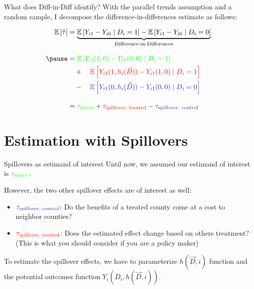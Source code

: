 \documentclass[aspectratio=169]{beamer}
\begin{document}
\begin{frame}{What does Diff-in-Diff identify?}
    With the parallel trends assumption and a random sample, I decompose the difference-in-differences estimate as follows: 
        
    \begin{align*}
        \mathbb{E}\left[\hat{\tau}\right] &= \underbrace{\mathbb{E} \left[ Y_{i1} - Y_{i0} \mid D_i = 1 \right] - \mathbb{E} \left[ Y_{i1} - Y_{i0} \mid D_i = 0 \right]}_{\text{Difference-in-Differences}} \\[3mm]
        \pause&= 
        \textcolor{green}{\mathbb{E} \left[ Y_{i1}(1, 0) - Y_{i1}(0, 0) \mid D_i = 1 \right]} \\
        &\quad + \quad 
        \textcolor{red}{\mathbb{E} \left[ Y_{i1}(1, h_i(\vec{D})) - Y_{i1}(1, 0) \mid D_i = 1 \right]} \\ 
        &\quad - \quad  
        \textcolor{purple}{\mathbb{E} \left[ Y_{i1}(0, h_i(\vec{D})) - Y_{i1}(0, 0) \mid D_i = 0 \right]} \\[3mm]
        &= \textcolor{green}{\tau_{\text{direct}}} + \textcolor{red}{\tau_{\text{spillover, treated}}} - \textcolor{purple}{\tau_{\text{spillover, control}}}
    \end{align*}

\end{frame}


\section{Estimation with Spillovers}

\begin{frame}{Spillovers as estimand of interest}
    Until now, we assumed our estimand of interest is $\textcolor{green}{\tau_{\text{direct}}}$.
    
    However, the two other spillover effects are of interest as well:
    \begin{itemize}
        \item $\textcolor{purple}{\tau_{\text{spillover, control}}}$: Do the benefits of a treated county come at a cost to neighbor counties? 
        
        \item $\textcolor{red}{\tau_{\text{spillover, treated}}}$: Does the estimated effect change based on others treatment? (This is what you should consider if you are a policy maker)
    \end{itemize}
    
    To estimate the spillover effects, we have to parameterize $h(\vec{D}, i)$ function and the potential outcomes function $Y_i(D_i, h(\vec{D}, i))$.
\end{frame}
\end{document}
